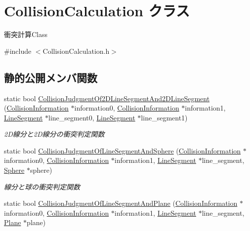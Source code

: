 \hypertarget{class_collision_calculation}{}\section{Collision\+Calculation クラス}
\label{class_collision_calculation}


衝突計算\+Class  




{\ttfamily \#include $<$Collision\+Calculation.\+h$>$}

\subsection*{静的公開メンバ関数}
\begin{DoxyCompactItemize}
\item 
static bool \mbox{\hyperlink{class_collision_calculation_af511e5bfb51712f6f4cc962b3b219dd1}{Collision\+Judgment\+Of2\+D\+Line\+Segment\+And2\+D\+Line\+Segment}} (\mbox{\hyperlink{class_collision_information}{Collision\+Information}} $\ast$information0, \mbox{\hyperlink{class_collision_information}{Collision\+Information}} $\ast$information1, \mbox{\hyperlink{class_line_segment}{Line\+Segment}} $\ast$line\+\_\+segment0, \mbox{\hyperlink{class_line_segment}{Line\+Segment}} $\ast$line\+\_\+segment1)
\begin{DoxyCompactList}\small\item\em 2\+D線分と2\+D線分の衝突判定関数 \end{DoxyCompactList}\item 
static bool \mbox{\hyperlink{class_collision_calculation_ab04fd3cdd00a74c3b5c415b8d1754bf8}{Collision\+Judgment\+Of\+Line\+Segment\+And\+Sphere}} (\mbox{\hyperlink{class_collision_information}{Collision\+Information}} $\ast$information0, \mbox{\hyperlink{class_collision_information}{Collision\+Information}} $\ast$information1, \mbox{\hyperlink{class_line_segment}{Line\+Segment}} $\ast$line\+\_\+segment, \mbox{\hyperlink{class_sphere}{Sphere}} $\ast$sphere)
\begin{DoxyCompactList}\small\item\em 線分と球の衝突判定関数 \end{DoxyCompactList}\item 
static bool \mbox{\hyperlink{class_collision_calculation_ab00ccff76a9664372549724c3a5b04e0}{Collision\+Judgment\+Of\+Line\+Segment\+And\+Plane}} (\mbox{\hyperlink{class_collision_information}{Collision\+Information}} $\ast$information0, \mbox{\hyperlink{class_collision_information}{Collision\+Information}} $\ast$information1, \mbox{\hyperlink{class_line_segment}{Line\+Segment}} $\ast$line\+\_\+segment, \mbox{\hyperlink{class_plane}{Plane}} $\ast$plane)

\end{DoxyCompactItemize}
